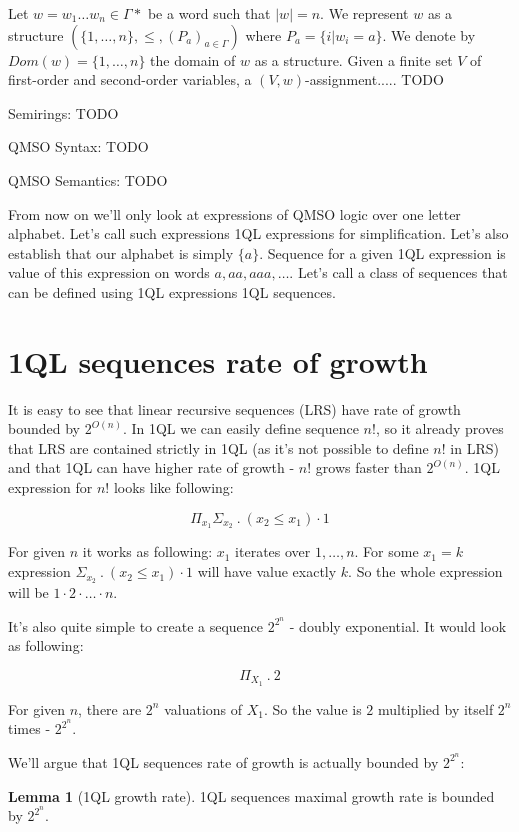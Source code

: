 \documentclass[12pt]{article}
\theoremstyle{definition}
\newtheorem{lemma}[theorem]{Lemma}
\begin{document}
Let $w = w_1\ldots w_n \in \Gamma*$ be a word such that $|w| = n$. We represent $w$ as a structure $(\{1,\ldots,n\}, \leq, (P_a)_{a \in \Gamma})$ where $P_a = \{i | w_i = a\}$. We denote by $Dom(w) = \{1,\ldots,n\}$ the domain of $w$ as a structure. Given a finite set $V$ of first-order and second-order variables, a $(V, w)$-assignment..... TODO

Semirings: TODO

QMSO Syntax: TODO

QMSO Semantics: TODO

From now on we'll only look at expressions of QMSO logic over one letter alphabet. Let's call such expressions 1QL expressions for simplification. Let's also establish that our alphabet is simply $\{a\}$. Sequence for a given 1QL expression is value of this expression on words $a, aa, aaa, \ldots$. Let's call a class of sequences that can be defined using 1QL expressions 1QL sequences.

\section{1QL sequences rate of growth}
It is easy to see that linear recursive sequences (LRS) have rate of growth bounded by $2^{O(n)}$. In 1QL we can easily define sequence $n!$, so it already proves that LRS are contained strictly in 1QL (as it's not possible to define $n!$ in LRS) and that 1QL can have higher rate of growth - $n!$ grows faster than $2^{O(n)}$. 1QL expression for $n!$ looks like following:

$$\Pi_{x_1}\Sigma_{x_2} \ . \ (x_2 \leq x_1) \cdot 1$$

For given $n$ it works as following: $x_1$ iterates over $1,\ldots,n$. For some $x_1 = k$ expression $\Sigma_{x_2} \ . \ (x_2 \leq x_1) \cdot 1$ will have value exactly $k$. So the whole expression will be $1 \cdot 2 \cdot \ldots \cdot n$.

It's also quite simple to create a sequence $2^{2^n}$ - doubly exponential. It would look as following:

$$\Pi_{X_1} \ . \ 2$$

For given $n$, there are $2^n$ valuations of $X_1$. So the value is $2$ multiplied by itself $2^n$ times - $2^{2^n}$.

We'll argue that 1QL sequences rate of growth is actually bounded by $2^{2^n}$:

\begin{lemma}[1QL growth rate]
1QL sequences maximal growth rate is bounded by $2^{2^n}$.
\end{lemma}
\end{document}
